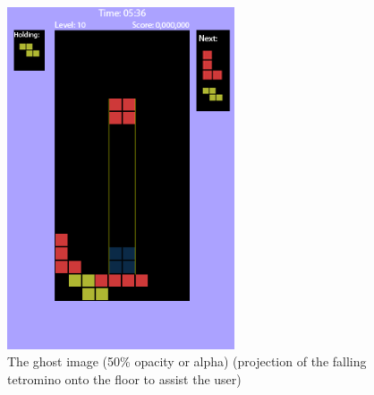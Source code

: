\documentclass[10pt]{report}
\theoremstyle{definition}
\theoremstyle{remark}
\begin{document}
\begin{figure}
\label{fig:hardDrop}
  \centering
    \includegraphics[width=0.6\textwidth]{hardDrop}
    \caption[Hard drop]{The ghost image (50\% opacity or alpha) (projection of the falling tetromino onto the floor to assist the user)}
\end{figure}
\end{document}
